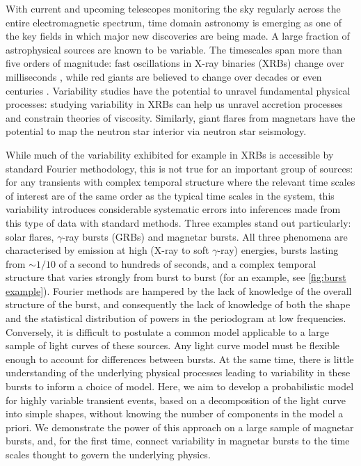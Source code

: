 \documentclass[12pt]{emulateapj}
\begin{document}
With current and upcoming telescopes monitoring the sky regularly across the entire electromagnetic spectrum, time domain astronomy is emerging as one of the key fields in which major new discoveries are being made.  A large fraction of astrophysical sources are known to be variable. The timescales span more than five orders of magnitude: fast oscillations in X-ray binaries (XRBs) change over milliseconds \citep[e.g.][]{xrb_khzqpos}, while red giants are believed to change over decades or even centuries \citep[e.g.][]{dasch_giants}. Variability studies have the potential to unravel fundamental physical processes: studying variability in XRBs can help us unravel accretion processes and constrain theories of viscosity. Similarly, giant flares from magnetars have the potential to map the neutron star interior via neutron star seismology. 

While much of the variability exhibited for example in XRBs is accessible by standard Fourier methodology, this is not true for an important group of sources: for any transients with complex temporal structure where the relevant time scales of interest are of the same order as the typical time scales in the system,  this variability introduces considerable systematic errors into inferences made from this type of data with standard methods. Three examples stand out particularly: solar flares, $\gamma$-ray bursts (GRBs) and magnetar bursts. All three phenomena are characterised by emission at high (X-ray to soft $\gamma$-ray) energies, bursts lasting from $\sim 1/10$ of a second to hundreds of seconds, and a complex temporal structure that varies strongly from burst to burst (for an example, see \ref{fig:burst example}). Fourier methods are hampered by the lack of knowledge of the overall structure of the burst, and consequently the lack of knowledge of both the shape and the statistical distribution of powers in the periodogram at low frequencies. Conversely, it is difficult to postulate a common model applicable to a large sample of light curves of these sources. Any light curve model must be flexible enough to account for differences between bursts. At the same time, there is little understanding of the underlying physical processes leading to variability in these bursts to inform a choice of model. Here, we aim to develop a probabilistic model for highly variable transient events, based on a decomposition of the light curve into simple shapes, without knowing the number of components in the model a priori. We demonstrate the power of this approach on a large sample of magnetar bursts, and, for the first time, connect variability in magnetar bursts to the time scales thought to govern the underlying physics.
\end{document}
